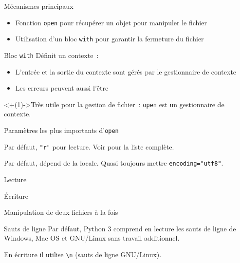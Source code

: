 \begin{frame}{Mécanismes principaux}
  \begin{itemize}[<+->]
    \item Fonction \texttt{open} pour récupérer un objet pour manipuler le fichier
    \item Utilisation d'un bloc \texttt{with} pour garantir la fermeture du fichier
  \end{itemize}
\end{frame}

\begin{frame}{Bloc \texttt{with}}
  Définit un contexte~:
  \begin{itemize}[<+(1)->]
    \item L'entrée et la sortie du contexte sont gérés par le gestionnaire de contexte
    \item Les erreurs peuvent aussi l'être
  \end{itemize}

  \onslide<+(1)->{Très utile pour la gestion de fichier~: \texttt{open} est un gestionnaire de contexte.}
\end{frame}

\begin{frame}{Paramètres les plus importants d'\texttt{open}}
  \begin{description}[<+->]
    \item[\texttt{mode}] Par défaut, \texttt{"r"} pour lecture. Voir  pour la liste complète.
    \item[\texttt{encoding}] Par défaut, dépend de la locale. Quasi toujours mettre \texttt{encoding="utf8"}.
  \end{description}
\end{frame}

\begin{frame}{Lecture}
\end{frame}

\begin{frame}{Écriture}
\end{frame}

\begin{frame}{Manipulation de deux fichiers à la fois}
\end{frame}

\begin{frame}{Sauts de ligne}
  Par défaut, Python 3 comprend en lecture les sauts de ligne de Windows, Mac OS et GNU/Linux sans travail additionnel.

  En écriture il utilise \texttt{\textbackslash n} (sauts de ligne GNU/Linux).
\end{frame}
